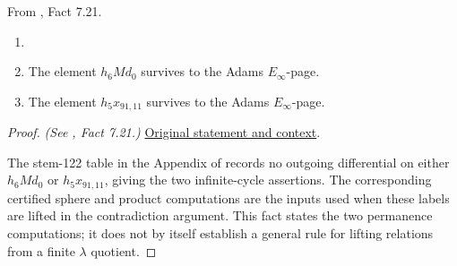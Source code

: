 \begin{fact}
\label{paper:7.21}
From \cite{LWX126}, Fact 7.21.\par
\label{fact:stem122}
\begin{enumerate}
    \item[] 
    \item The element $h_6 M d_0$ survives to the Adams $E_\infty$-page.
    \item The element $h_5x_{91,11}$ survives to the Adams $E_\infty$-page.
\end{enumerate}



\end{fact}
\begin{proof}
\textit{(See \cite{LWX126}, Fact 7.21.)} \href{paper/main.tex.html#L2689}{Original statement and context}.

The stem-122 table in the Appendix of \cite{LWX126} records no outgoing differential on either $h_6Md_0$ or $h_5x_{91,11}$, giving the two infinite-cycle assertions. The corresponding certified sphere and product computations are the inputs used when these labels are lifted in the contradiction argument. This fact states the two permanence computations; it does not by itself establish a general rule for lifting relations from a finite $\lambda$ quotient.
\end{proof}
